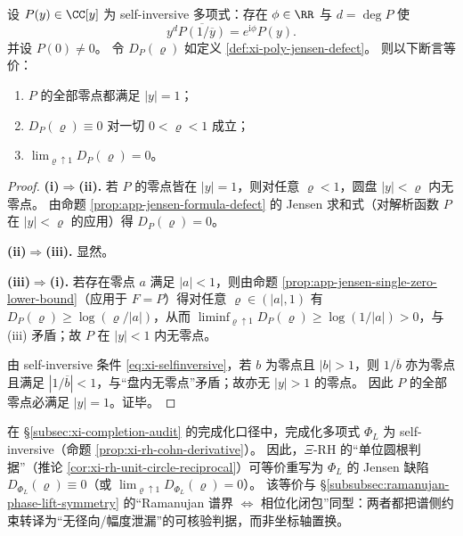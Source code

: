 \begin{theorem}\label{thm:xi-selfinversive-jensen-criterion}
设 \(P(y)\in\CC[y]\) 为 self-inversive 多项式：存在 \(\phi\in\RR\) 与 \(d=\deg P\) 使
\begin{equation}\label{eq:xi-selfinversive}
y^{d}\overline{P(1/\overline{y})}=e^{\mathrm{i}\phi}P(y).
\end{equation}
并设 \(P(0)\neq 0\)。
令 \(D_P(\varrho)\) 如定义 \ref{def:xi-poly-jensen-defect}。
则以下断言等价：
\begin{enumerate}
  \item[(i)] \(P\) 的全部零点都满足 \(|y|=1\)；
  \item[(ii)] \(D_{P}(\varrho)\equiv 0\) 对一切 \(0<\varrho<1\) 成立；
  \item[(iii)] \(\displaystyle \lim_{\varrho\uparrow 1}D_{P}(\varrho)=0\)。
\end{enumerate}
\end{theorem}

\begin{proof}
\textbf{(i)\(\Rightarrow\)(ii).}
若 \(P\) 的零点皆在 \(|y|=1\)，则对任意 \(\varrho<1\)，圆盘 \(|y|<\varrho\) 内无零点。
由命题 \ref{prop:app-jensen-formula-defect} 的 Jensen 求和式（对解析函数 \(P\) 在 \(|y|<\varrho\) 的应用）得 \(D_P(\varrho)=0\)。
\par
\textbf{(ii)\(\Rightarrow\)(iii).} 显然。
\par
\textbf{(iii)\(\Rightarrow\)(i).}
若存在零点 \(a\) 满足 \(|a|<1\)，则由命题 \ref{prop:app-jensen-single-zero-lower-bound}（应用于 \(F=P\)）得对任意 \(\varrho\in(|a|,1)\) 有
\(
D_P(\varrho)\ge \log(\varrho/|a|)
\)，从而
\(
\liminf_{\varrho\uparrow 1}D_P(\varrho)\ge \log(1/|a|)>0
\)，与 (iii) 矛盾；故 \(P\) 在 \(|y|<1\) 内无零点。
\par
由 self-inversive 条件 \eqref{eq:xi-selfinversive}，若 \(b\) 为零点且 \(|b|>1\)，则 \(1/\overline{b}\) 亦为零点且满足 \(|1/\overline{b}|<1\)，与“盘内无零点”矛盾；故亦无 \(|y|>1\) 的零点。
因此 \(P\) 的全部零点必满足 \(|y|=1\)。证毕。
\end{proof}

\begin{corollary}\label{cor:xi-finite-ramanujan-defect-translation}
在 \S\ref{subsec:xi-completion-audit} 的完成化口径中，完成化多项式 \(\Phi_L\) 为 self-inversive（命题 \ref{prop:xi-rh-cohn-derivative}）。
因此，\(\Xi\)-RH 的“单位圆根判据”（推论 \ref{cor:xi-rh-unit-circle-reciprocal}）可等价重写为 \(\Phi_L\) 的 Jensen 缺陷 \(D_{\Phi_L}(\varrho)\equiv 0\)（或 \(\lim_{\varrho\uparrow 1}D_{\Phi_L}(\varrho)=0\)）。
该等价与 \S\ref{subsubsec:ramanujan-phase-lift-symmetry} 的“Ramanujan 谱界 \(\Leftrightarrow\) 相位化闭包”同型：两者都把谱侧约束转译为“无径向/幅度泄漏”的可核验判据，而非坐标轴置换。
\end{corollary}

